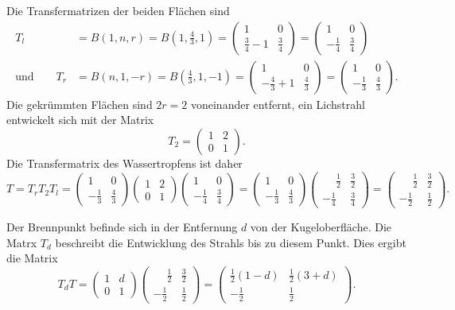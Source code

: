 \begin{loesung}
Die Transfermatrizen der beiden Flächen sind
\begin{align*}
T_l
&=
B(1,n,r)
=
B(1,{\textstyle \frac43},1)
=
\begin{pmatrix} 1&0\\\frac34-1&\frac34 \end{pmatrix}
=
\begin{pmatrix} 1&0\\-\frac14&\frac34 \end{pmatrix}
\\
\text{und}\qquad
T_r
&=
B(n,1,-r)
=
B({\textstyle \frac43},1,-1)
=
\begin{pmatrix} 1&0\\-\frac43+1&\frac43 \end{pmatrix}
=
\begin{pmatrix} 1&0\\-\frac13&\frac43 \end{pmatrix}.
\end{align*}
Die gekrümmten Flächen sind $2r=2$ voneinander entfernt, ein Lichstrahl
entwickelt sich mit der Matrix 
\[
T_2
=
\begin{pmatrix}1&2\\0&1\end{pmatrix}.
\]
Die Transfermatrix des Wassertropfens ist daher
\[
T
=
T_rT_2T_l
=
\begin{pmatrix} 1&0\\-\frac13&\frac43 \end{pmatrix}
\begin{pmatrix}1&2\\0&1\end{pmatrix}
\begin{pmatrix} 1&0\\-\frac14&\frac34 \end{pmatrix}
=
\begin{pmatrix} 1&0\\-\frac13&\frac43 \end{pmatrix}
\begin{pmatrix} \phantom{-}\frac12 & \frac32 \\ -\frac14 & \frac34 \end{pmatrix}
=
\begin{pmatrix}
\phantom{-}\frac12 & \frac32 \\
-\frac12 & \frac12
\end{pmatrix}.
\]

Der Brennpunkt befinde sich in der Entfernung $d$ von der Kugeloberfläche.
Die Matrx $T_d$ beschreibt die Entwicklung des Strahls bis zu diesem Punkt.
Dies ergibt die Matrix
\[
T_dT
=
\begin{pmatrix}
1&d\\0&1
\end{pmatrix}
\begin{pmatrix}
\phantom{-}\frac12 & \frac32 \\
-\frac12 & \frac12
\end{pmatrix}
=
\begin{pmatrix}
\frac12(1-d) & \frac12(3+d) \\
-\frac12 & \frac12
\end{pmatrix}.
\]


\end{loesung}
